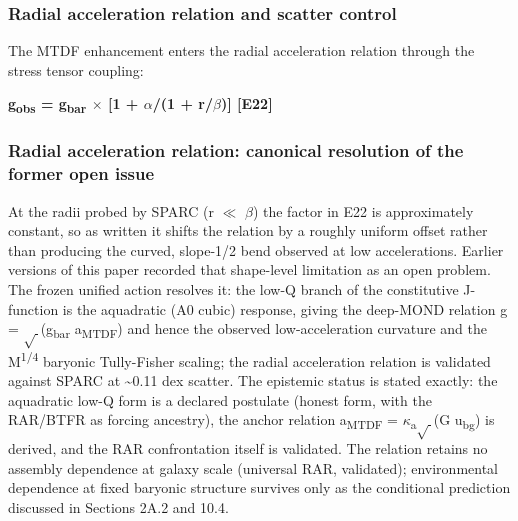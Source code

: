 \documentclass[11pt,a4paper]{article}
\begin{document}
\subsubsection{Radial acceleration relation and scatter control}
The MTDF enhancement enters the radial acceleration relation through the stress tensor coupling:

\textbf{g\textsubscript{obs} = g\textsubscript{bar} $\times$ [1 + $\alpha$/(1 + r/\allowbreak{}$\beta$)] [E22]}

\begin{mdframed}[linecolor=accent,linewidth=0.5pt,backgroundcolor=callout-bg,leftline=true,rightline=true,topline=true,bottomline=true,innerleftmargin=8pt,innerrightmargin=8pt,innertopmargin=6pt,innerbottommargin=6pt]
\subsubsection{Radial acceleration relation: canonical resolution of the former open issue}
At the radii probed by SPARC (r $\ll$ $\beta$) the factor in E22 is approximately constant, so as written it shifts the relation by a roughly uniform offset rather than producing the curved, slope-1/\allowbreak{}2 bend observed at low accelerations. Earlier versions of this paper recorded that shape-level limitation as an open problem. The frozen unified action resolves it: the low-Q branch of the constitutive J-function is the aquadratic (A0 cubic) response, giving the deep-MOND relation g = $\sqrt{\,}$(g\textsubscript{bar} a\textsubscript{MTDF}) and hence the observed low-acceleration curvature and the M\textsuperscript{1/\allowbreak{}4} baryonic Tully-Fisher scaling; the radial acceleration relation is validated against SPARC at \~{}0.11 dex scatter. The epistemic status is stated exactly: the aquadratic low-Q form is a declared postulate (honest form, with the RAR/\allowbreak{}BTFR as forcing ancestry), the anchor relation a\textsubscript{MTDF} = $\kappa$\textsubscript{a}$\sqrt{\,}$(G u\textsubscript{bg}) is derived, and the RAR confrontation itself is validated. The relation retains no assembly dependence at galaxy scale (universal RAR, validated); environmental dependence at fixed baryonic structure survives only as the conditional prediction discussed in Sections 2A.2 and 10.4.
\end{mdframed}
\end{document}
